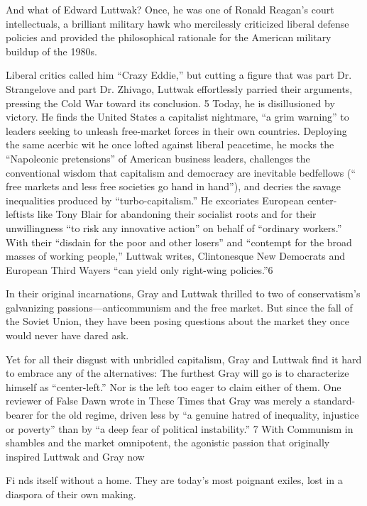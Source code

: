  \par 
And what of Edward Luttwak? Once, he was one of Ronald Reagan’s court intellectuals, a brilliant military hawk who mercilessly criticized liberal defense policies and provided the philosophical rationale for the American military buildup of the 1980s.
 \par 
Liberal critics called him “Crazy Eddie,” but cutting a figure that was part Dr. Strangelove and part Dr. Zhivago, Luttwak effortlessly parried their arguments, pressing the Cold War toward its conclusion. {\color{blue}5} Today, he is disillusioned by victory. He finds the United States a capitalist nightmare, “a grim warning” to leaders seeking to unleash free-market forces in their own countries. Deploying the same acerbic wit he once lofted against liberal peacetime, he mocks the “Napoleonic pretensions” of American business leaders, challenges the conventional wisdom that capitalism and democracy are inevitable bedfellows (“ free markets and less free societies go hand in hand”), and decries the savage inequalities produced by “turbo-capitalism.” He excoriates European center-leftists like Tony Blair for abandoning their socialist roots and for their unwillingness “to risk any innovative action” on behalf of “ordinary workers.” With their “disdain for the poor and other losers” and “contempt for the broad masses of working people,” Luttwak writes, Clintonesque New Democrats and European Third Wayers “can yield only right-wing policies.”{\color{blue}6}
 \par 
In their original incarnations, Gray and Luttwak thrilled to two of conservatism’s galvanizing passions—anticommunism and the free market. But since the fall of the Soviet Union, they have been posing questions about the market they once would never have dared ask.
 \par 
Yet for all their disgust with unbridled capitalism, Gray and Luttwak find it hard to embrace any of the alternatives: The furthest Gray will go is to characterize himself as “center-left.” Nor is the left too eager to claim either of them. One reviewer of False Dawn wrote in These Times that Gray was merely a standard-bearer for the old regime, driven less by “a genuine hatred of inequality, injustice or poverty” than by “a deep fear of political instability.” {\color{blue}7} With Communism in shambles and the market omnipotent, the agonistic passion that originally inspired Luttwak and Gray now
 \par 
Fi nds itself without a home. They are today’s most poignant exiles, lost in a diaspora of their own making.

